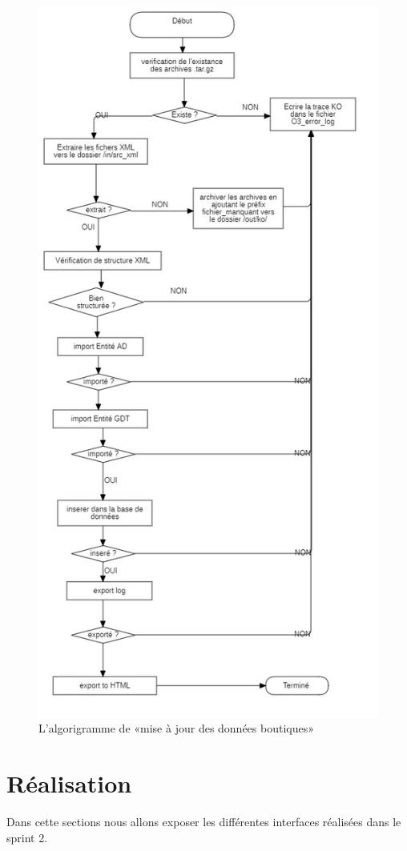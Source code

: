 \begin{figure}[H]
	\centering
	\includegraphics[width=0.6\linewidth]{img/conception/FlowchartDiagram-update-boutique}
	\caption[L'algorigramme de «mise à jour des données boutiques»]{L'algorigramme de «mise à jour des données boutiques»}
	\label{fig:flowchartdiagram-update-boutique}
\end{figure}

\section{Réalisation}
Dans cette sections nous allons exposer les différentes interfaces réalisées dans le sprint 2. 
